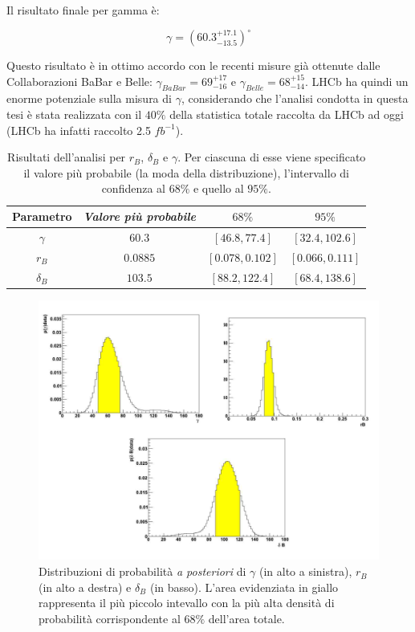 Il risultato finale per gamma è:

\begin{equation}
 \gamma = (60.3^{+17.1}_{-13.5})^{\circ}
\end{equation}
 
Questo risultato è in ottimo accordo con le recenti misure già ottenute dalle Collaborazioni BaBar\cite{BaBar} e Belle\cite{Belle}: $\gamma_{BaBar} = 69^{+17}_{-16}$ e $ \gamma_{Belle} =  68^{+15}_{-14}$.
LHCb ha quindi un enorme potenziale sulla misura di $\gamma$, considerando che l'analisi condotta in questa tesi è stata realizzata con il $40\%$ della statistica totale raccolta da LHCb ad oggi (LHCb ha infatti raccolto 2.5 $fb^{-1}$).

\begin{table}
\begin{center}
\begin{tabular}{|c|c|c|c|}\hline
\textbf{Parametro} & \textbf{\textit{Valore più probabile}} & \textbf{$68\%$} & \textbf{$95\%$}\\\hline
$\gamma$ & $60.3$ & $[46.8, 77.4]$ &  $[32.4,102.6]$   \\\hline
$r_B$ & $0.0885$ & $[0.078, 0.102]$ &  $[0.066,0.111]$   \\\hline
$\delta_B$ & $103.5$ & $[88.2, 122.4]$ &  $[68.4,138.6]$ \\\hline
\end{tabular}
\caption{Risultati dell'analisi per $r_B$, $\delta_B$ e $\gamma$. Per ciascuna di esse viene specificato il valore più probabile (la moda della distribuzione), l'intervallo di confidenza
 al $68\%$ e quello al $95\%$. }
\label{risultati}
\end{center}
\end{table}
\begin{figure}[htbp] 
\begin{center}
\includegraphics[width=1\textwidth]{Immagini/Plot}
\caption{Distribuzioni di probabilità \emph{a posteriori} di $\gamma$ (in alto a sinistra), $r_B$ (in alto a destra) e $\delta_B$ (in basso). L'area evidenziata in giallo rappresenta il più piccolo intevallo con la più alta densità di probabilità corrispondente al $68\%$ dell'area totale. }
\label{grafici}
\end{center}
\end{figure}

